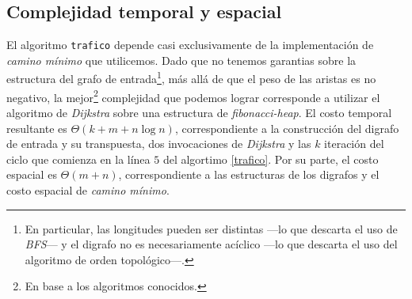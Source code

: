 \subsection{Complejidad temporal y espacial}

El algoritmo \texttt{trafico} depende casi exclusivamente de la implementación de \textit{camino mínimo} que utilicemos. %
Dado que no tenemos garantias sobre la estructura del grafo de entrada\footnote{En particular, las longitudes pueden ser distintas ---lo que descarta el uso de \textit{BFS}--- y el digrafo no es necesariamente acíclico ---lo que descarta el uso del algoritmo de orden topológico---.}, más allá de que el peso de las aristas es no negativo, la mejor\footnote{ En base a los algoritmos conocidos.} complejidad que podemos lograr corresponde a utilizar el algoritmo de \textit{Dijkstra} sobre una estructura de \textit{fibonacci-heap}. El costo temporal resultante es $\Theta(k + m + n\log n)$, correspondiente a la construcción del digrafo de entrada y su transpuesta, dos invocaciones de \textit{Dijkstra} y las $k$ iteración del ciclo que comienza en la línea $5$ del algortimo \ref{trafico}. Por su parte, el costo espacial es $\Theta(m + n)$, correspondiente a las estructuras de los digrafos y el costo espacial de \textit{camino mínimo}.  %
